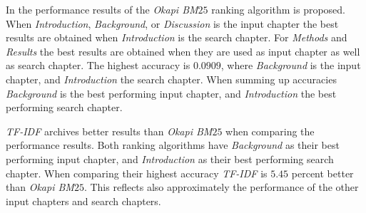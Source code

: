 In  the performance results of the \textit{Okapi BM$25$} ranking algorithm is proposed. When \textit{Introduction}, \textit{Background}, or \textit{Discussion} is the input chapter the best results are obtained when \textit{Introduction} is the search chapter. For \textit{Methods} and \textit{Results} the best results are obtained when they are used as input chapter as well as search chapter. The highest accuracy is $0.0909$, where \textit{Background} is the input chapter, and \textit{Introduction} the search chapter. When summing up accuracies \textit{Background} is the best performing input chapter, and \textit{Introduction} the best performing search chapter.

\textit{TF-IDF} archives better results than \textit{Okapi BM$25$} when comparing the performance results. Both ranking algorithms have \textit{Background} as their best performing input chapter, and \textit{Introduction} as their best performing search chapter. When comparing their highest accuracy \textit{TF-IDF} is $5.45$ percent better than \textit{Okapi BM$25$}. This reflects also
approximately the performance of the other input chapters and search chapters.


